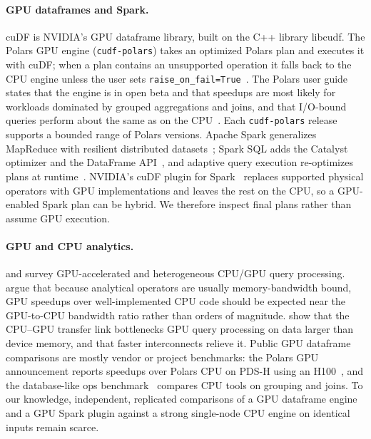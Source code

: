\documentclass[sigconf, nonacm]{acmart}
\begin{document}
\paragraph{GPU dataframes and Spark.} cuDF is NVIDIA's GPU dataframe library,
built on the C++ library libcudf. The Polars GPU engine (\texttt{cudf-polars})
takes an optimized Polars plan and executes it with cuDF; when a plan contains
an unsupported operation it falls back to the CPU engine unless the user sets
\texttt{raise\_on\_fail=True}~\citep{polars_gpu_guide,cudf_polars_docs}. The
Polars user guide states that the engine is in open beta and that speedups are
most likely for workloads dominated by grouped aggregations and joins, and that
I/O-bound queries perform about the same as on the CPU~\citep{polars_gpu_guide}.
Each \texttt{cudf-polars} release supports a bounded range of Polars versions.
Apache Spark generalizes MapReduce with resilient distributed
datasets~\citep{zaharia2012rdd,zaharia2016spark}; Spark SQL adds the Catalyst
optimizer and the DataFrame API~\citep{armbrust2015sparksql}, and adaptive query
execution re-optimizes plans at runtime~\citep{spark359docs}. NVIDIA's cuDF
plugin for Spark~\citep{nvidia_cudf_spark_docs,nvidia_cudf_spark_repo} replaces
supported physical operators with GPU implementations and leaves the rest on
the CPU, so a GPU-enabled Spark plan can be hybrid. We therefore inspect final
plans rather than assume GPU execution.

\paragraph{GPU and CPU analytics.} \citet{bress2014gpudb} and
\citet{rosenfeld2022heterogeneous} survey GPU-accelerated and heterogeneous
CPU/GPU query processing. \citet{shanbhag2020gpucpu} argue that because
analytical operators are usually memory-bandwidth bound, GPU speedups over
well-implemented CPU code should be expected near the GPU-to-CPU bandwidth
ratio rather than orders of magnitude. \citet{lutz2020pump} show that the
CPU--GPU transfer link bottlenecks GPU query processing on data larger than
device memory, and that faster interconnects relieve it. Public GPU dataframe
comparisons are mostly vendor or project benchmarks: the Polars GPU
announcement reports speedups over Polars CPU on PDS-H using an
H100~\citep{semaan2024polarsgpu}, and the database-like ops
benchmark~\citep{dbbenchmark} compares CPU tools on grouping and joins. To our
knowledge, independent, replicated comparisons of a GPU dataframe engine and a
GPU Spark plugin against a strong single-node CPU engine on identical inputs
remain scarce.
\end{document}
